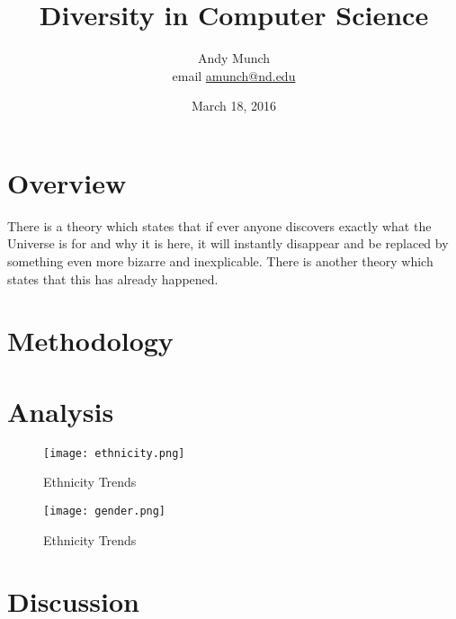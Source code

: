 \documentclass{article}
\title{Diversity in Computer Science}
\author{Andy Munch \\ email \href{mailto:amunch@nd.edu}{amunch@nd.edu}}
\date{March 18, 2016}
\begin{document}
\maketitle

\section{Overview}
There is a theory which states that if ever anyone discovers exactly what the Universe is for and why it is here, it will instantly disappear and be replaced by something even more bizarre and inexplicable.
There is another theory which states that this has already happened.

\section{Methodology}

\section{Analysis}

\begin{figure}[!h]
\centering
\texttt{[image: ethnicity.png]}
\caption{Ethnicity Trends}
\label{fig:ethnicity}
\end{figure}

\begin{figure}[!h]
\centering
\texttt{[image: gender.png]}
\caption{Ethnicity Trends}
\label{fig:ethnicity}
\end{figure}

\section{Discussion}
\end{document}
